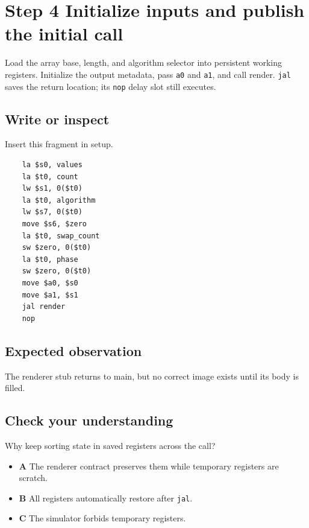 \section{Step 4 Initialize inputs and publish the initial
  call}\label{009-sorting-visualizer-s04-step-4-initialize-inputs-and-publish-the-initial-call}

Load the array base, length, and algorithm selector into persistent
working registers. Initialize the output metadata, pass \texttt{a0} and
\texttt{a1}, and call render. \texttt{jal} saves the return location;
its \texttt{nop} delay slot still executes.

\subsection{Write or
  inspect}\label{009-sorting-visualizer-s04-write-or-inspect}

Insert this fragment in setup.

\begin{verbatim}
    la $s0, values
    la $t0, count
    lw $s1, 0($t0)
    la $t0, algorithm
    lw $s7, 0($t0)
    move $s6, $zero
    la $t0, swap_count
    sw $zero, 0($t0)
    la $t0, phase
    sw $zero, 0($t0)
    move $a0, $s0
    move $a1, $s1
    jal render
    nop
\end{verbatim}

\subsection{Expected
  observation}\label{009-sorting-visualizer-s04-expected-observation}

The renderer stub returns to main, but no correct image exists until its
body is filled.

\subsection{Check your
  understanding}\label{009-sorting-visualizer-s04-check-your-understanding}

Why keep sorting state in saved registers across the call?

\begin{itemize}
  \tightlist
  \item
        \textbf{A} The renderer contract preserves them while temporary
        registers are scratch.
  \item
        \textbf{B} All registers automatically restore after \texttt{jal}.
  \item
        \textbf{C} The simulator forbids temporary registers.
\end{itemize}
